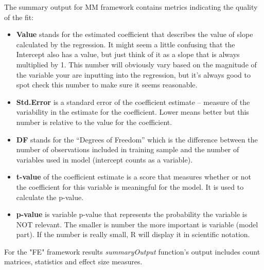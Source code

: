 \documentclass[12pt,a4paper]{article}
\begin{document}
The summary output for MM framework contains metrics indicating the quality of the fit:
\begin{itemize}
 \item \textbf{Value} stands for the estimated coefficient that describes the value of slope calculated by the regression. 
It might seem a little confusing that the Intercept also has a value, but just think of it as a slope that is always multiplied by 1. 
This number will obviously vary based on the magnitude of the variable your are inputting into the regression, but it's always good to spot check this number to make sure it seems reasonable.

\item \textbf{Std.Error} is a standard error of the coefficient estimate -- measure of the variability in the estimate for the coefficient.
Lower means better but this number is relative to the value for the coefficient. 

\item \textbf{DF} stands for the ``Degrees of Freedom'' which is the difference between the number of observations included in training sample and the number of variables used in model (intercept counts as a variable).

\item \textbf{t-value} of the coefficient estimate is a score that measures whether or not the coefficient for this variable is meaningful for the model. It is used to calculate the p-value.

\item \textbf{p-value} is variable p-value that represents the probability the variable is NOT relevant. The smaller is number the more important is variable (model part). If the number is really small, R will display it in scientific notation.
\end{itemize}

For the "FE" framework results \textit{summaryOutput} function's output includes count matrices, statistics and effect size measures.
\end{document}
